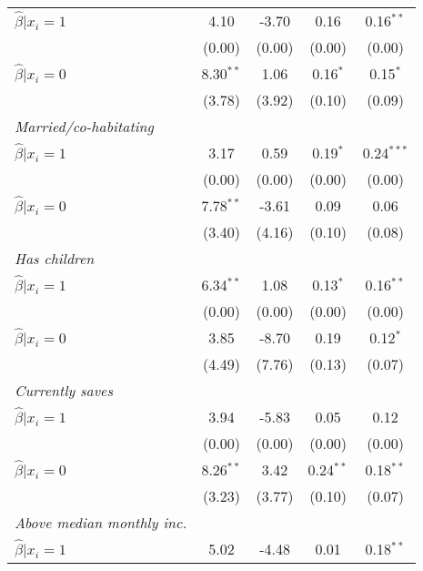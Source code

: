\begin{table}[h]
{\begin{threeparttable}
\begin{tabular}{l*{4}{c}}
\hspace{0.5cm} \(\hat\beta|x_i=1\)&     4.10&    -3.70&     0.16&0.16$^{**}$\\
                &   (0.00)&   (0.00)&   (0.00)&   (0.00)\\
\hspace{0.5cm} \(\hat\beta|x_i=0\)&8.30$^{**}$&     1.06&0.16$^{*}$&0.15$^{*}$\\
                &   (3.78)&   (3.92)&   (0.10)&   (0.09)\\
\textit{Married/co-habitating}&         &         &         &         \\
\hspace{0.5cm} \(\hat\beta|x_i=1\)&     3.17&     0.59&0.19$^{*}$&0.24$^{***}$\\
                &   (0.00)&   (0.00)&   (0.00)&   (0.00)\\
\hspace{0.5cm} \(\hat\beta|x_i=0\)&7.78$^{**}$&    -3.61&     0.09&     0.06\\
                &   (3.40)&   (4.16)&   (0.10)&   (0.08)\\
\textit{Has children}&         &         &         &         \\
\hspace{0.5cm} \(\hat\beta|x_i=1\)&6.34$^{**}$&     1.08&0.13$^{*}$&0.16$^{**}$\\
                &   (0.00)&   (0.00)&   (0.00)&   (0.00)\\
\hspace{0.5cm} \(\hat\beta|x_i=0\)&     3.85&    -8.70&     0.19&0.12$^{*}$\\
                &   (4.49)&   (7.76)&   (0.13)&   (0.07)\\
\textit{Currently saves}&         &         &         &         \\
\hspace{0.5cm} \(\hat\beta|x_i=1\)&     3.94&    -5.83&     0.05&     0.12\\
                &   (0.00)&   (0.00)&   (0.00)&   (0.00)\\
\hspace{0.5cm} \(\hat\beta|x_i=0\)&8.26$^{**}$&     3.42&0.24$^{**}$&0.18$^{**}$\\
                &   (3.23)&   (3.77)&   (0.10)&   (0.07)\\
\textit{Above median monthly inc.}&         &         &         &         \\
\hspace{0.5cm} \(\hat\beta|x_i=1\)&     5.02&    -4.48&     0.01&0.18$^{**}$\\

\end{tabular}
\end{threeparttable}}
\end{table}
